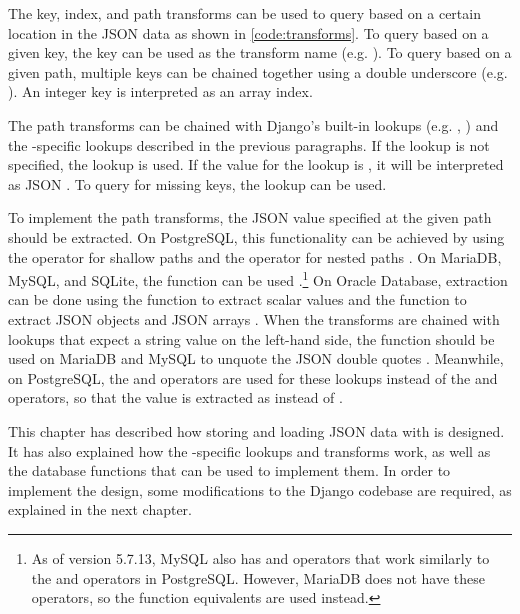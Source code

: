 \noindent
\begin{minipage}{\linewidth}

\end{minipage}

The key, index, and path transforms can be used to query based on a certain
location in the JSON data as shown in \autoref{code:transforms}. To query based
on a given key, the key can be used as the transform name (e.g.
). To query based on a given path, multiple keys can be
chained together using a double underscore (e.g. ).
An integer key is interpreted as an array index.

The path transforms can be chained with Django's built-in lookups (e.g.
, ) and the -specific lookups
described in the previous paragraphs. If the lookup is not specified, the
 lookup is used. If the value for the  lookup is
, it will be interpreted as JSON . To query for missing
keys, the  lookup can be used.

To implement the path transforms, the JSON value specified at the given path
should be extracted. On PostgreSQL, this functionality can be achieved by using
the \code{->} operator for shallow paths and the \code{\#>} operator for nested
paths \cite{postgres:json_operators}. On MariaDB, MySQL, and SQLite, the
 function can be used \cite{mariadb:json_extract,
mysql:json_search, sqlite:json1}.\footnote{As of version 5.7.13, MySQL also has
\code{->} and \code{->>} operators that work similarly to the \code{\#>} and
\code{\#>>} operators in PostgreSQL. However, MariaDB does not have these
operators, so the function equivalents are used instead.} On Oracle Database,
extraction can be done using the  function to extract scalar
values and the  function to extract JSON objects and JSON
arrays \cite{oracle:json_value, oracle:json_query}. When the transforms are
chained with lookups that expect a string value on the left-hand side, the
 function should be used on MariaDB and MySQL to unquote
the JSON double quotes \cite{mariadb:json_unquote, mysql:json_modify}.
Meanwhile, on PostgreSQL, the \code{->>} and \code{\#>>} operators are used for
these lookups instead of the \code{->} and \code{\#>} operators, so that the
value is extracted as  instead of .

This chapter has described how storing and loading JSON data with
 is designed. It has also explained how the
-specific lookups and transforms work, as well as the database
functions that can be used to implement them. In order to implement the design,
some modifications to the Django codebase are required, as explained in the
next chapter.
